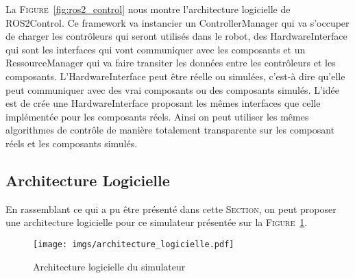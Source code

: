             La \textsc{Figure}~\ref{fig:ros2_control} nous montre l'architecture logicielle de \gls{ROS2Control}. Ce framework va instancier un \gls{ControllerManager} qui va s'occuper de charger les contrôleurs qui seront utilisés dans le robot, des \gls{HardwareInterface} qui sont les interfaces qui vont communiquer avec les composants et un \gls{RessourceManager} qui va faire transiter les données entre les contrôleurs et les composants. L'\gls{HardwareInterface} peut être réelle ou simulées, c'est-à dire qu'elle peut communiquer avec des vrai composants ou des composants simulés. L'idée est de crée une \gls{HardwareInterface} proposant les mêmes interfaces que celle implémentée pour les composants réels. Ainsi on peut utiliser les mêmes algorithmes de contrôle de manière totalement transparente sur les composant réels et les composants simulés.

        \subsection{Architecture Logicielle}

            En rassemblant ce qui a pu être présenté dans cette \textsc{Section}, on peut proposer une architecture logicielle pour ce simulateur présentée sur la \textsc{Figure}~\ref{fig:architecture_logicielle}.
            
            \begin{figure}[!htb]
                \centering
                \texttt{[image: imgs/architecture\_logicielle.pdf]}
                \caption{Architecture logicielle du simulateur}
                \label{fig:architecture_logicielle}
            \end{figure}